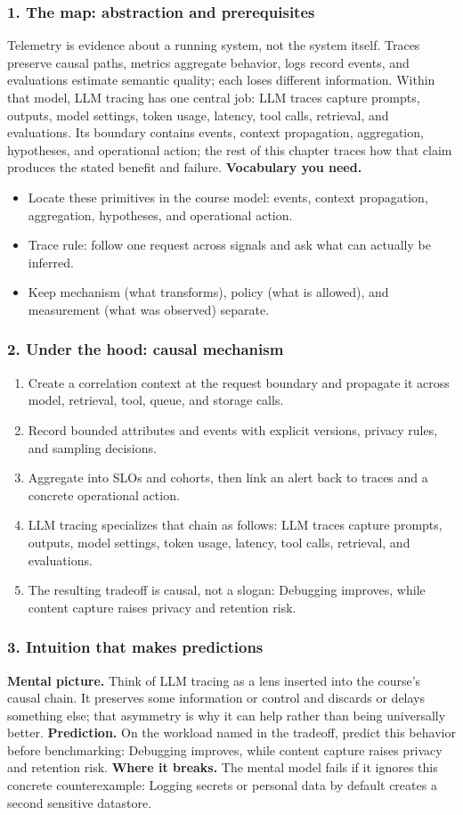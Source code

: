 \subsubsection*{1. The map: abstraction and prerequisites}
Telemetry is evidence about a running system, not the system itself. Traces preserve causal paths, metrics aggregate behavior, logs record events, and evaluations estimate semantic quality; each loses different information.
Within that model, LLM tracing has one central job: LLM traces capture prompts, outputs, model settings, token usage, latency, tool calls, retrieval, and evaluations. Its boundary contains events, context propagation, aggregation, hypotheses, and operational action; the rest of this chapter traces how that claim produces the stated benefit and failure.
\textbf{Vocabulary you need.}\begin{itemize}
\item Locate these primitives in the course model: events, context propagation, aggregation, hypotheses, and operational action.
\item Trace rule: follow one request across signals and ask what can actually be inferred.
\item Keep mechanism (what transforms), policy (what is allowed), and measurement (what was observed) separate.
\end{itemize}
\subsubsection*{2. Under the hood: causal mechanism}\begin{enumerate}
\item Create a correlation context at the request boundary and propagate it across model, retrieval, tool, queue, and storage calls.
\item Record bounded attributes and events with explicit versions, privacy rules, and sampling decisions.
\item Aggregate into SLOs and cohorts, then link an alert back to traces and a concrete operational action.
\item LLM tracing specializes that chain as follows: LLM traces capture prompts, outputs, model settings, token usage, latency, tool calls, retrieval, and evaluations.
\item The resulting tradeoff is causal, not a slogan: Debugging improves, while content capture raises privacy and retention risk.
\end{enumerate}
\subsubsection*{3. Intuition that makes predictions}
\textbf{Mental picture.} Think of LLM tracing as a lens inserted into the course's causal chain. It preserves some information or control and discards or delays something else; that asymmetry is why it can help rather than being universally better.
\textbf{Prediction.} On the workload named in the tradeoff, predict this behavior before benchmarking: Debugging improves, while content capture raises privacy and retention risk.
\textbf{Where it breaks.} The mental model fails if it ignores this concrete counterexample: Logging secrets or personal data by default creates a second sensitive datastore.
